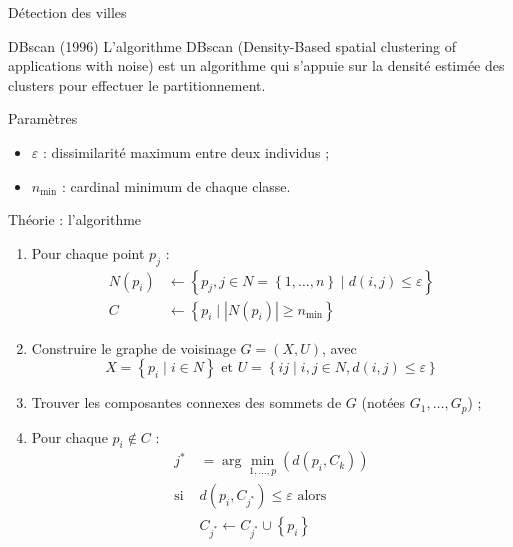 {\begin{frame}{Détection des villes}
    \begin{block}{DBscan (1996)}
        L'algorithme DBscan (Density-Based spatial clustering of applications with noise) est un algorithme qui s'appuie sur la densité estimée des clusters pour effectuer le partitionnement.
    \end{block}
    \begin{block}{Paramètres}
        \begin{itemize}
            \item $\varepsilon$ : dissimilarité maximum entre deux individus ;
            \item $n_{\min}$ : cardinal minimum de chaque classe.
        \end{itemize}
    \end{block}
\end{frame}

\begin{frame}{Théorie : l'algorithme}
    \begin{block}{}
        \begin{enumerate}
            \item Pour chaque point $p_{j}$ :
                \begin{align*}
                    N\left(p_{i}\right) & \gets\left\{ p_{j}, j\in N=\left\{ 1, \dots, n\right\} \mid d(i,j)\leqslant\varepsilon\right\} \\
                    C & \gets\left\{ p_{i}\mid\left|N\left(p_{i}\right)\right|\geqslant n_{\min}\right\} 
                \end{align*}
            \item Construire le graphe de voisinage $G=\left(X, U\right)$, avec $$X=\left\{ p_{i}\mid i\in N\right\} \text{ et } U=\left\{ ij\mid i, j\in N,d(i,j)\leqslant\varepsilon\right\}$$
            \item Trouver les composantes connexes des sommets de $G$ (notées $G_{1}, \dots, G_{p}$) ;
            \item Pour chaque $p_{i}\notin C$ :
                \begin{align*}
                    j^{*} & =\arg\min_{1, \dots, p}\left(d\left(p_{i}, C_{k}\right)\right)\\
                    \text{si } & d\left(p_{i}, C_{j^{*}}\right)\leqslant\varepsilon\text{ alors}\\
                     & C_{j^{*}}\gets C_{j^{*}}\cup\left\{ p_{i}\right\} 
                \end{align*}
        \end{enumerate}
    \end{block}    
\end{frame}

}
